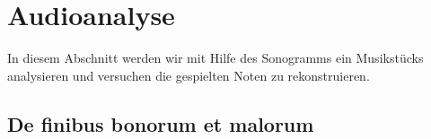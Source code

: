 %
%
%
%
\section{Audioanalyse
\label{sonogramm:section:teil2}}
In diesem Abschnitt werden wir mit Hilfe des Sonogramms ein Musikstücks
analysieren und versuchen die gespielten Noten zu rekonstruieren.

\subsection{De finibus bonorum et malorum
\label{sonogramm:subsection:bonorum}}


